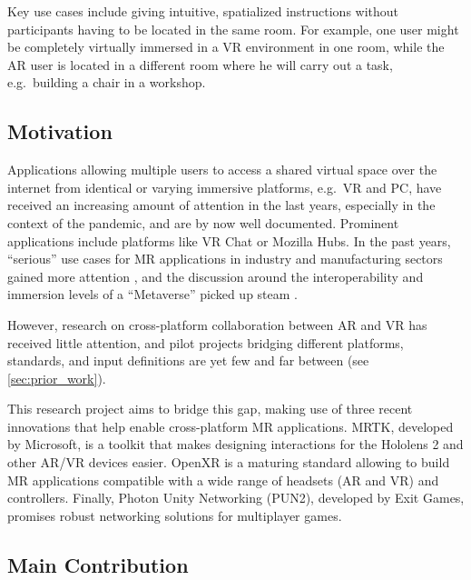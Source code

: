 \documentclass[10pt,twocolumn,letterpaper,english]{article}
\begin{document}
Key use cases include giving intuitive, spatialized instructions without participants having to be located in the same room. For example, one user might be completely virtually immersed in a VR environment in one room, while the AR user is located in a different room where he will carry out a task, e.g.\ building a chair in a workshop.

\subsection{Motivation}

Applications allowing multiple users to access a shared virtual space over the internet from identical or varying immersive platforms, e.g.\ VR and PC, have received an increasing amount of attention in the last years, especially in the context of the pandemic, and are by now well documented. Prominent applications include platforms like VR Chat or Mozilla Hubs. In the past years, ``serious'' use cases for MR applications in industry and manufacturing sectors gained more attention \cite{augmentedrealityinproduction}, and the discussion around the interoperability and immersion levels of a ``Metaverse'' picked up steam \cite{metaverse}.

However, research on cross-platform collaboration between AR and VR has received little attention, and pilot projects bridging different platforms, standards, and input definitions are yet few and far between (see \cref{sec:prior_work}).

This research project aims to bridge this gap, making use of three recent innovations that help enable cross-platform MR applications. MRTK\cite{polar-kevMRTKUnityDeveloperDocumentation}, developed by Microsoft, is a toolkit that makes designing interactions for the Hololens 2 and other AR/VR devices easier. OpenXR\cite{OpenXR} is a maturing standard allowing to build MR applications compatible with a wide range of headsets (AR and VR) and controllers. Finally, Photon Unity Networking (PUN2)\cite{PhotonUnity3D}, developed by Exit Games, promises robust networking solutions for multiplayer games.

\subsection{Main Contribution}
\end{document}
